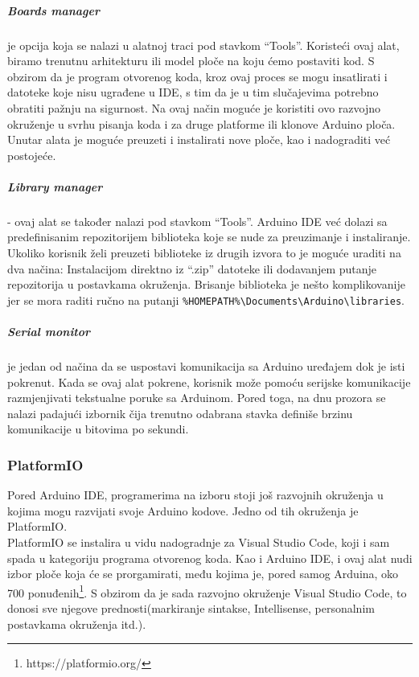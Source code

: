 \documentclass[../Document.tex]{subfiles}
\begin{document}
\subparagraph{Boards manager} je opcija koja se nalazi u alatnoj traci pod stavkom ``Tools''. Koristeći ovaj alat, biramo trenutnu arhitekturu ili model ploče na koju ćemo postaviti kod. S obzirom da je program otvorenog koda, kroz ovaj proces se mogu insatlirati i datoteke koje nisu ugrađene u IDE, s tim da je u tim slučajevima potrebno obratiti pažnju na sigurnost. Na ovaj način moguće je koristiti ovo razvojno okruženje u svrhu pisanja koda i za druge platforme ili klonove Arduino ploča. Unutar alata je moguće preuzeti i instalirati nove ploče, kao i nadograditi već postojeće.


\subparagraph{Library manager} - ovaj alat se također nalazi pod stavkom ``Tools''. Arduino IDE već dolazi sa predefinisanim repozitorijem biblioteka koje se nude za preuzimanje i instaliranje. Ukoliko korisnik želi preuzeti biblioteke iz drugih izvora to je moguće uraditi na dva načina: Instalacijom direktno iz ``.zip'' datoteke ili dodavanjem putanje repozitorija u postavkama okruženja. Brisanje biblioteka je nešto komplikovanije jer se mora raditi ručno na putanji \verb|%HOMEPATH%\Documents\Arduino\libraries|.


\subparagraph{Serial monitor} je jedan od načina da se uspostavi komunikacija sa Arduino uređajem dok je isti pokrenut. Kada se ovaj alat pokrene, korisnik može pomoću serijske komunikacije razmjenjivati tekstualne poruke sa Arduinom. Pored toga, na dnu prozora se nalazi padajući izbornik čija trenutno odabrana stavka definiše brzinu komunikacije u bitovima po sekundi.


\subsubsection{PlatformIO}

Pored Arduino IDE, programerima na izboru stoji još razvojnih okruženja u kojima mogu razvijati svoje Arduino kodove. Jedno od tih okruženja je PlatformIO.\\

PlatformIO se instalira u vidu nadogradnje za Visual Studio Code, koji i sam spada u kategoriju programa otvorenog koda. Kao i Arduino IDE, i ovaj alat nudi izbor ploče koja će se prorgamirati, među kojima je, pored samog Arduina, oko 700 ponuđenih\footnote{https://platformio.org/}. S obzirom da je sada razvojno okruženje Visual Studio Code, to donosi sve njegove prednosti(markiranje sintakse, Intellisense, personalnim postavkama okruženja itd.).\\
\end{document}
